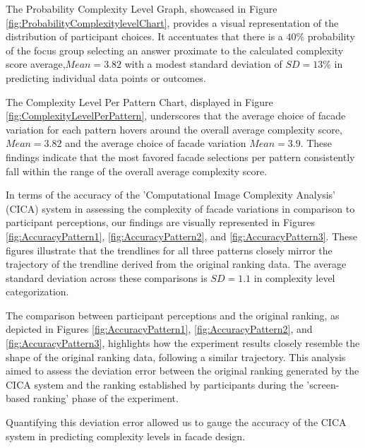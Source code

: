 
The Probability Complexity Level Graph, showcased in Figure \ref{fig:ProbabilityComplexitylevelChart}, provides a visual representation of the distribution of participant choices.
It accentuates that there is a \(40\%\) probability of the focus group selecting an answer proximate to the calculated complexity score average,\(Mean = 3.82\) with a modest standard deviation of \(SD = 13\%\) in predicting individual data points or outcomes.


The Complexity Level Per Pattern Chart, displayed in Figure \ref{fig:ComplexityLevelPerPattern}, underscores that the average choice of facade variation for each pattern hovers around the overall average complexity score,\(Mean = 3.82\) and the average choice of facade variation \(Mean = 3.9\).
These findings indicate that the most favored facade selections per pattern consistently fall within the range of the overall average complexity score.


In terms of the accuracy of the 'Computational Image Complexity Analysis' (CICA) system in assessing the complexity of facade variations in comparison to participant perceptions, our findings are visually represented in Figures \ref{fig:AccuracyPattern1}, \ref{fig:AccuracyPattern2}, and \ref{fig:AccuracyPattern3}.
These figures illustrate that the trendlines for all three patterns closely mirror the trajectory of the trendline derived from the original ranking data.
The average standard deviation across these comparisons is \(SD = 1.1\) in complexity level categorization.


The comparison between participant perceptions and the original ranking, as depicted in Figures \ref{fig:AccuracyPattern1}, \ref{fig:AccuracyPattern2}, and \ref{fig:AccuracyPattern3}, highlights how the experiment results closely resemble the shape of the original ranking data, following a similar trajectory.
This analysis aimed to assess the deviation error between the original ranking generated by the CICA system and the ranking established by participants during the 'screen-based ranking' phase of the experiment.

Quantifying this deviation error allowed us to gauge the accuracy of the CICA system in predicting complexity levels in facade design.

